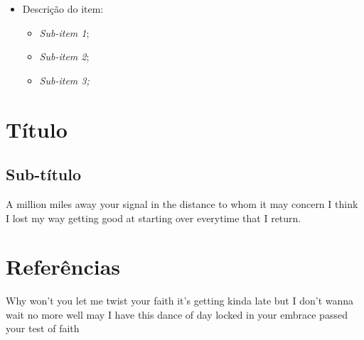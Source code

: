 \documentclass[12pt]{article}
\begin{document}
	\begin{itemize}
		\item Descrição do item:
		\begin{itemize}
			\item {\it Sub-item 1};
			\item {\it Sub-item 2};
			\item {\it Sub-item 3;}
		\end{itemize}
	\end{itemize}
	
	\section{Título}
	\subsection{Sub-título}

	A million miles away your signal in the distance to whom it may concern I think I lost my way getting good at starting over everytime that I return.

	\section{Referências}
	
	Why won't you let me twist your faith it's getting kinda late but I don't wanna wait no more well may I have this dance of day locked in your embrace passed your test of faith\cite{ahu61}

	

	{}
	
\end{document}
